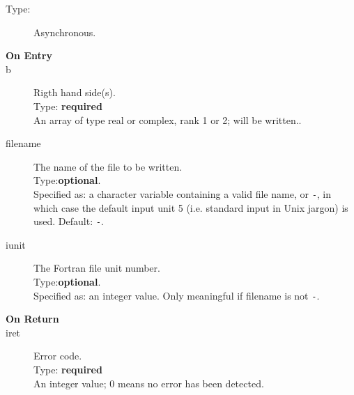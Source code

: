 \begin{description}
\item[Type:] Asynchronous.
\item[\bf  On Entry ]
\item[b] Rigth hand side(s).\\
Type: {\bf required} \\
An  array of type real or complex, rank 1 or 2; will be written..\
\item[filename] The name of the file to be written.\\
Type:{\bf optional}.\\
Specified as: a character variable containing a valid file name, or
\verb|-|, in which case the default input unit  5 (i.e. standard input
in Unix jargon) is used. Default: \verb|-|. 
\item[iunit] The Fortran file unit number.\\
Type:{\bf optional}.\\
Specified as: an integer value. Only meaningful if filename is not \verb|-|.
\end{description}

\begin{description}
\item[\bf On Return]
\item[iret] Error code.\\
Type: {\bf required} \\
An integer value; 0 means no error has been detected. 
\end{description}



